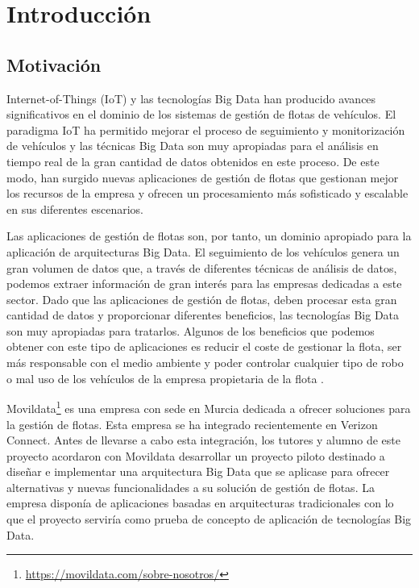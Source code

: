 
\section{Introducción}
\subsection{Motivación}
\par
Internet-of-Things (IoT) y las tecnologías Big Data han producido avances significativos en el dominio de los sistemas de gestión de flotas de vehículos. El paradigma IoT ha permitido mejorar el proceso de seguimiento y monitorización de vehículos y las técnicas Big Data son muy apropiadas para el análisis en tiempo real de la gran cantidad de datos obtenidos en este proceso\cite{1-1-3}. De este modo, han surgido nuevas aplicaciones de gestión de flotas que gestionan mejor los recursos de la empresa y ofrecen un procesamiento más sofisticado y escalable en sus diferentes escenarios.
\par
Las aplicaciones de gestión de flotas son, por tanto, un dominio apropiado para la aplicación de arquitecturas Big Data. El seguimiento de los vehículos genera un gran volumen de datos que, a través de diferentes técnicas de análisis de datos, podemos extraer información de gran interés para las empresas dedicadas a este sector. Dado que las aplicaciones de gestión de flotas, deben procesar esta gran cantidad de datos y proporcionar diferentes beneficios, las tecnologías Big Data son muy apropiadas para tratarlos. Algunos de los beneficios que podemos obtener con este tipo de aplicaciones es reducir el coste de gestionar la flota, ser más responsable con el medio ambiente y poder controlar cualquier tipo de robo o mal uso de los vehículos de la empresa propietaria de la flota \cite{1-1-1} \cite{1-1-2}.
\par
Movildata\footnote{\url{https://movildata.com/sobre-nosotros/}} es una empresa con sede en Murcia dedicada a ofrecer soluciones para la gestión de flotas. Esta empresa se ha integrado recientemente en Verizon Connect. Antes de llevarse a cabo esta integración, los tutores y alumno de este proyecto acordaron con Movildata desarrollar un proyecto piloto destinado a diseñar e implementar una arquitectura Big Data que se aplicase para ofrecer alternativas y nuevas funcionalidades a su solución de gestión de flotas. La empresa disponía de aplicaciones basadas en arquitecturas tradicionales con lo que el proyecto serviría como prueba de concepto de aplicación de tecnologías Big Data.
\par
